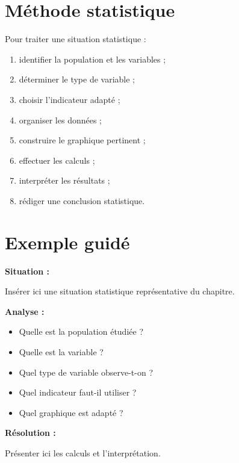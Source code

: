 \documentclass[11pt,a4paper]{article}
\begin{document}
\section{Méthode statistique}

\begin{cadremethode}
Pour traiter une situation statistique :

\begin{enumerate}
    \item identifier la population et les variables ;
    \item déterminer le type de variable ;
    \item choisir l’indicateur adapté ;
    \item organiser les données ;
    \item construire le graphique pertinent ;
    \item effectuer les calculs ;
    \item interpréter les résultats ;
    \item rédiger une conclusion statistique.
\end{enumerate}
\end{cadremethode}

\section{Exemple guidé}

\begin{cadreexemple}
\textbf{Situation :}

Insérer ici une situation statistique représentative du chapitre.

\medskip

\textbf{Analyse :}
\begin{itemize}
    \item Quelle est la population étudiée ?
    \item Quelle est la variable ?
    \item Quel type de variable observe-t-on ?
    \item Quel indicateur faut-il utiliser ?
    \item Quel graphique est adapté ?
\end{itemize}

\medskip

\textbf{Résolution :}

Présenter ici les calculs et l’interprétation.
\end{cadreexemple}
\end{document}

